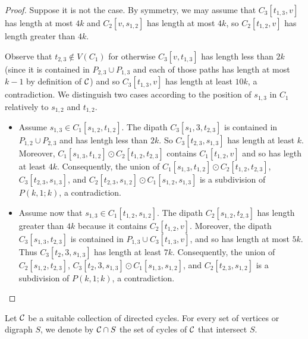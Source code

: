 \documentclass[utf8,10pt]{article}
\theoremstyle{plain}
\theoremstyle{definition}
\theoremstyle{remark}
\begin{document}
\begin{proof}
Suppose it is not the case. By symmetry, we may assume that $C_3[t_{1,3},v]$ has length at most $4k$ and
$C_2[v, s_{1,2}]$ has length at most $4k$, so  $C_2[t_{1,2},v]$ has length greater than $4k$.

Observe that $t_{2,3}\notin V(C_1)$ for otherwise $C_3[v,t_{1,3}]$ has length less than $2k$ (since it is contained in $P_{2,3}\cup P_{1,3}$ and each of those paths has length at most $k-1$ by definition of ${\cal C}$) and so $C_3[t_{1,3},v]$ has length at least $10k$, a contradiction.
We distinguish two cases according to the position of $s_{1,3}$ in $C_1$ relatively to $s_{1,2}$ and $t_{1,2}$.

\begin{itemize}
	\item Assume $s_{1,3}\in C_1[s_{1,2},t_{1,2}]$. The dipath  $C_3[s_1,3,t_{2,3}]$ is contained in $P_{1,2}\cup P_{2,3}$ and has lentgh less than $2k$. So $C_3[t_{2,3}, s_{1,3}]$ has length at least $k$. Moreover, $C_1[s_{1,3}, t_{1,2}]\odot C_2[t_{1,2}, t_{2,3}]$ contains $C_1[t_{1,2}, v]$  and so has legth at least $4k$. Consequently, the union of $C_1[s_{1,3}, t_{1,2}]\odot C_2[t_{1,2}, t_{2,3}]$, $C_3[t_{2,3}, s_{1,3}]$, and
$C_2[t_{2,3}, s_{1,2}]\odot C_1[s_{1,2}, s_{1,3}]$ is a subdivision of $P(k,1;k)$, a contradiction.

	\item Assume now that $s_{1,3}\in C_1[t_{1,2},s_{1,2}]$. The dipath  $C_2[s_{1,2}, t_{2,3}]$ has length greater than $4k$ because it contains $C_2[t_{1,2},v]$. Moreover, the dipath $C_3[s_{1,3}, t_{2,3}]$ is contained in $P_{1,3}\cup C_3[t_{1,3},v]$, and so has length at most $5k$.
	Thus $C_3[t_2,3, s_{1,3}]$ has length at least $7k$.
	 Consequently, the union of $C_2[s_{1,2}, t_{2,3}]$, $C_3[t_2,3, s_{1,3}]\odot C_1[s_{1,3}, s_{1,2}]$, and $C_2[t_{2,3}, s_{1,2}]$ is a subdivision of $P(k,1;k)$, a contradiction.
\end{itemize}
\end{proof}
 
 
 
 
 
 

Let ${\cal C}$ be a suitable collection of directed cycles.
For every set of vertices or digraph $S$, we denote by ${\cal C}\cap S$ the set of cycles of ${\cal C}$ that intersect $S$. 
\end{document}
